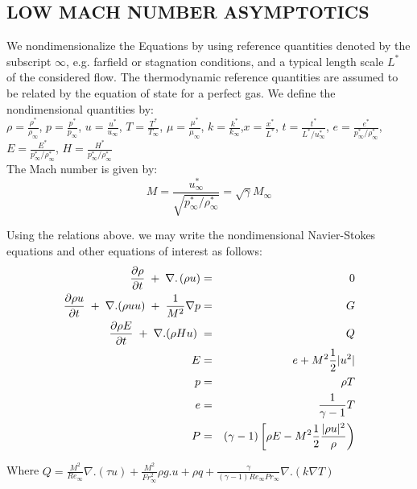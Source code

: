 \documentclass[11pt,a4paper]{article}
\begin{document}
\subsection{LOW MACH NUMBER ASYMPTOTICS}
We nondimensionalize the Equations by using reference quantities denoted by the subscript $\infty$,
e.g. farfield or stagnation conditions, and a typical length scale $L^*$ of the considered
flow. The thermodynamic reference quantities are assumed to be related by the equation of
state for a perfect gas. We define the nondimensional quantities by:\\
$\rho = \frac{\rho^*}{\rho_\infty} $, $p = \frac{p^*}{p_\infty} $, $u = \frac{u^*}{u_\infty} $, $T = \frac{T^*}{T_\infty} $, $\mu = \frac{\mu^*}{\mu_\infty} $, $k = \frac{k^*}{k_\infty} $,$x = \frac{x^*}{L^*} $, $t = \frac{t^*}{L^*/u^*_{\infty}} $, $e = \frac{e^*}{p^*_{\infty}/\rho^*_{\infty}} $, $E = \frac{E^*}{p^*_{\infty}/\rho^*_{\infty}} $, $H = \frac{H^*}{p^*_{\infty}/\rho^*_{\infty}} $\\
The Mach number is given by:
$$ M = \frac{u^*_{\infty}}{\sqrt{p^*_{\infty}/\rho^*_{\infty}}}= \sqrt{\gamma}M_\infty$$

Using the relations above. we may write the nondimensional
Navier-Stokes equations and other equations of interest as follows:
\begin{eqnarray}
\frac{\partial \rho}{\partial t}\hspace{1mm}+\hspace{1mm}\nabla.\hspace{0.5mm}(\rho u) &=& 0 \\
\frac{\partial\rho u}{\partial t}\hspace{1mm}+\hspace{1mm}\nabla. (\rho u u) \hspace{1mm}+\hspace{1mm}\frac{1}{M^2}\nabla p &=& G \\
\frac{\partial\rho E}{\partial t}\hspace{1mm}+\hspace{1mm}\nabla. (\rho H u) \hspace{1mm}&=& Q \\
E &=& e + M^2\frac{1}{2}|u^2| \\
p &=& \rho T \\
e &=& \frac{1}{\gamma-1} T \\
P &=& (\gamma-1)\left[\rho E- M^2\frac{1}{2} \frac{|\rho u|^2}{\rho}\right)
\end{eqnarray}

\noindent Where $Q =  \frac{M^2}{Re_\infty}\nabla.(\tau u) + \frac{M^2}{{Fr}^2_\infty} \rho g.u + \rho q + \frac{\gamma}{(\gamma-1) Re_\infty Pr_\infty} \nabla. (k\nabla T)$ \\
\end{document}
